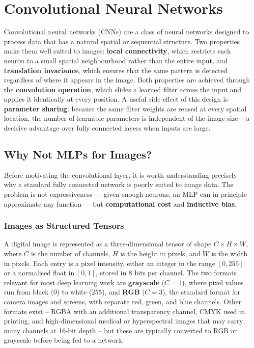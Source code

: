 
\section{Convolutional Neural Networks}
\label{sec:cnns}

Convolutional neural networks (CNNs) are a class of neural networks designed to process data that has a natural spatial or sequential structure. Two properties make them well suited to images: \textbf{local connectivity}, which restricts each neuron to a small spatial neighbourhood rather than the entire input, and \textbf{translation invariance}, which ensures that the same pattern is detected regardless of where it appears in the image. Both properties are achieved through the \textbf{convolution operation}, which slides a learned filter across the input and applies it identically at every position. A useful side effect of this design is \textbf{parameter sharing}: because the same filter weights are reused at every spatial location, the number of learnable parameters is independent of the image size -- a decisive advantage over fully connected layers when inputs are large.

\subsection{Why Not MLPs for Images?}
\label{sec:cnns:why_not_mlps}


Before motivating the convolutional layer, it is worth understanding precisely why a standard fully connected network is poorly suited to image data. The problem is not expressiveness --- given enough neurons, an MLP can in principle approximate any function --- but \textbf{computational cost} and \textbf{inductive bias}.

\subsubsection{Images as Structured Tensors}

A digital image is represented as a three-dimensional tensor of shape $C \times H \times W$, where $C$ is the number of channels, $H$ is the height in pixels, and $W$ is the width in pixels. Each entry is a pixel intensity, either an integer in the range $[0, 255]$ or a normalised float in $[0, 1]$, stored in 8 bits per channel. The two formats relevant for most deep learning work are \textbf{grayscale} ($C = 1$), where pixel values run from black ($0$) to white ($255$), and \textbf{RGB} ($C = 3$), the standard format for camera images and screens, with separate red, green, and blue channels. Other formats exist -- RGBA with an additional transparency channel, CMYK used in printing, and high-dimensional medical or hyperspectral images that may carry many channels at 16-bit depth -- but these are typically converted to RGB or grayscale before being fed to a network.

